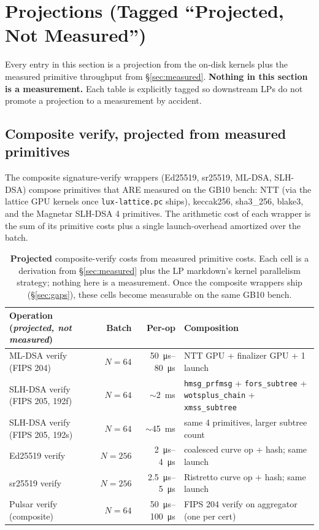 \section{Projections (Tagged ``Projected, Not Measured'')}
\label{sec:projections}

Every entry in this section is a projection from the on-disk
kernels plus the measured primitive throughput from
\S\ref{sec:measured}. \textbf{Nothing in this section is a
measurement.} Each table is explicitly tagged so downstream LPs
do not promote a projection to a measurement by accident.

\subsection{Composite verify, projected from measured primitives}

The composite signature-verify wrappers (Ed25519, sr25519,
ML-DSA, SLH-DSA) compose primitives that ARE measured on the
GB10 bench: NTT (via the lattice GPU kernels once
\texttt{lux-lattice.pc} ships), keccak256, sha3\_256, blake3,
and the Magnetar SLH-DSA 4 primitives. The arithmetic cost of
each wrapper is the sum of its primitive costs plus a single
launch-overhead amortized over the batch.

\begin{table}[h]
\centering
\small
\begin{tabular}{@{}p{3.6cm}rrp{4.5cm}@{}}
\toprule
\textbf{Operation (\emph{projected, not measured})}
  & \textbf{Batch} & \textbf{Per-op}
  & \textbf{Composition} \\
\midrule
ML-DSA verify (FIPS 204) & $N{=}64$
  & \SI{50}{\micro\second}--\SI{80}{\micro\second}
  & NTT GPU + finalizer GPU + 1 launch \\
SLH-DSA verify (FIPS 205, 192f)
  & $N{=}64$ & $\sim$\SI{2}{\milli\second}
  & \texttt{hmsg\_prfmsg} + \texttt{fors\_subtree} +
    \texttt{wotsplus\_chain} + \texttt{xmss\_subtree} \\
SLH-DSA verify (FIPS 205, 192s)
  & $N{=}64$ & $\sim$\SI{45}{\milli\second}
  & same 4 primitives, larger subtree count \\
Ed25519 verify & $N{=}256$ & \SI{2}{\micro\second}--\SI{4}{\micro\second}
  & coalesced curve op + hash; same launch \\
sr25519 verify & $N{=}256$ & \SI{2.5}{\micro\second}--\SI{5}{\micro\second}
  & Ristretto curve op + hash; same launch \\
Pulsar verify (composite) & $N{=}64$
  & \SI{50}{\micro\second}--\SI{100}{\micro\second}
  & FIPS 204 verify on aggregator (one per cert) \\
\bottomrule
\end{tabular}
\caption{\textbf{Projected} composite-verify costs from
measured primitive costs. Each cell is a derivation from
\S\ref{sec:measured} plus the LP markdown's kernel parallelism
strategy; nothing here is a measurement. Once the composite
wrappers ship (\S\ref{sec:gaps}), these cells become measurable
on the same GB10 bench.}
\label{tab:projections}
\end{table}

